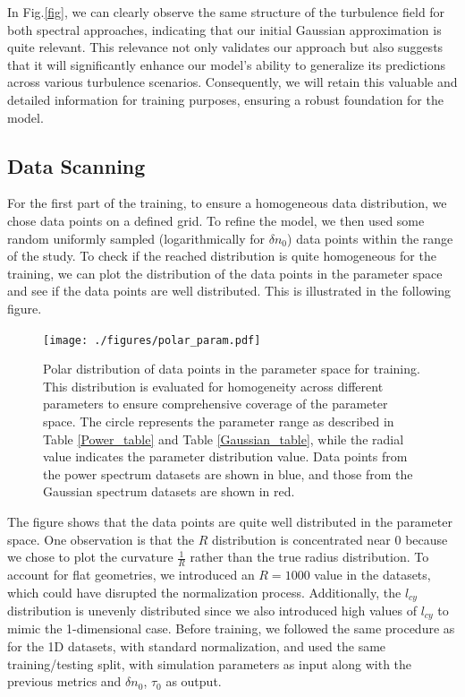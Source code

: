 \documentclass[11pt,a4paper,openany]{report}
\begin{document}
\begin{multicols}{2}
    In Fig.\ref{fig}, we can clearly observe the same structure of the turbulence field for both spectral approaches, indicating that our initial Gaussian approximation is quite relevant. This relevance not only validates our approach but also suggests that it will significantly enhance our model's ability to generalize its predictions across various turbulence scenarios. Consequently, we will retain this valuable and detailed information for training purposes, ensuring a robust foundation for the model.

    \subsection{Data Scanning}

    For the first part of the training, to ensure a homogeneous data distribution, we chose data points on a defined grid. To refine the model, we then used some random uniformly sampled (logarithmically for $\delta n_0$) data points within the range of the study. To check if the reached distribution is quite homogeneous for the training, we can plot the distribution of the data points in the parameter space and see if the data points are well distributed. This is illustrated in the following figure.

    \begin{figure}[H]
        \centering
        \texttt{[image: ./figures/polar\_param.pdf]}
        \caption{Polar distribution of data points in the parameter space for training. This distribution is evaluated for homogeneity across different parameters to ensure comprehensive coverage of the parameter space. The circle represents the parameter range as described in Table \ref{Power_table} and Table \ref{Gaussian_table}, while the radial value indicates the parameter distribution value. Data points from the power spectrum datasets are shown in blue, and those from the Gaussian spectrum datasets are shown in red.}
        \label{params_distr}
    \end{figure}
    The figure shows that the data points are quite well distributed in the parameter space. One observation is that the $R$ distribution is concentrated near 0 because we chose to plot the curvature $\frac{1}{R}$ rather than the true radius distribution. To account for flat geometries, we introduced an $R = 1000$ value in the datasets, which could have disrupted the normalization process. Additionally, the $l_{cy}$ distribution is unevenly distributed since we also introduced high values of $l_{cy}$ to mimic the 1-dimensional case. Before training, we followed the same procedure as for the 1D datasets, with standard normalization, and used the same training/testing split, with simulation parameters as input along with the previous metrics and $\delta n_0$, $\tau_0$ as output.


\end{multicols}
\end{document}
